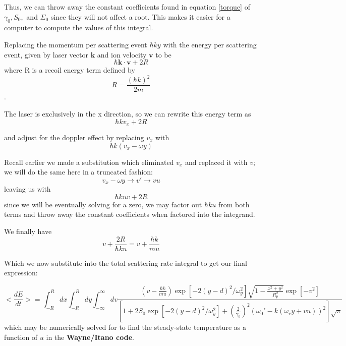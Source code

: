 \documentclass[11pt, oneside,reqno]{amsart}   	%
\newcommand{\eqn}[1]{\begin{equation}#1 \end{equation}}
\renewcommand{\vec}[1]{\textbf{#1}}
\begin{document}
 Thus, we can throw away the constant coefficients found in equation \ref{torque} of $\gamma_0, S_0,$ and $ \Sigma_0$ since they will not affect a root. This makes it easier for a computer to compute the values of this integral.
 
 Replacing the momentum per scattering event $\hbar k y$ with the energy per scattering event, given by laser vector $\vec{k}$ and ion velocity $\vec{v}$ to be
 \eqn{ \hbar \vec{k} \cdot \vec{v} + 2 R} where R is a recoil energy term defined by  \eqn{R= \frac{ (\hbar k )^2}{2m}}.
 
  The laser is exclusively in the x direction, so we can rewrite this energy term as 
  \eqn{\hbar k v_x + 2R}
  
  and adjust for the doppler effect by replacing $v_x$ with
  \eqn{ \hbar k (v_x-\omega y)}
  
  Recall earlier we made a substitution which eliminated $v_x$ and replaced it with $v$; we will do the same here in a truncated fashion:
 \eqn{ v_x - \omega y \rightarrow v' \rightarrow vu }
 leaving us with 
 \eqn{ \hbar k uv + 2R}
 since we will be eventually solving for a zero, we may factor out  $\hbar k u $ from both terms and throw away the constant coefficients when factored into the integrand.
 
 We finally have \eqn{ v + \frac{2R}{\hbar k u} = v+ \frac{\hbar k}{m u}}
 
 Which we now substitute into the total scattering rate integral to get our final expression:

  \eqn{ 
 <\frac{dE}{dt}> = 
 \int_{-R}^{R} dx \int_{-R}^R  dy \int_{-\infty}^{\infty} dv 
 \frac{
 (v- \frac{\hbar k}{m u})
 \exp [ -2 (y-d)^2/\omega_y^2] \sqrt{1-\frac{x^2+y^2}{R_p^2}} \exp [-v^2]
 }
 { \left[ 1+2S_0 \exp [ -2 (y-d)^2/\omega_y^2] +\left( \frac{2}{\gamma_0} \right)^2  (\omega_0' - k(\omega_r y +v u))^2 \right]\sqrt{\pi}}
 \label{dedt}
  }
  which may be numerically solved for to find the steady-state temperature as a function of $u$ in the \textbf{Wayne/Itano code}.
\end{document}
